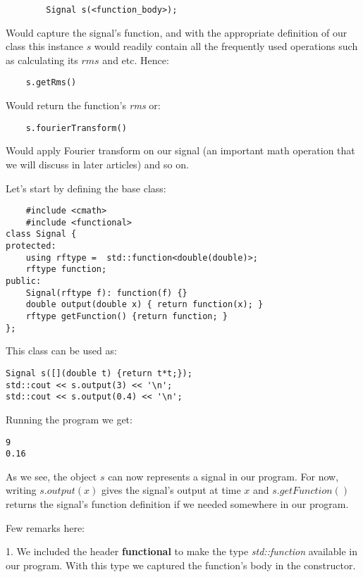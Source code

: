 \documentclass{article}
\begin{document}
	\begin{verbatim}
		Signal s(<function_body>);
	\end{verbatim}
	 
	Would capture the signal's function, and with the appropriate definition of our class this instance $s$ would readily contain all the frequently used operations such as calculating its $rms$ and etc. 
	Hence:
	
	\begin{verbatim}
	s.getRms()
	\end{verbatim}

	Would return the function's \textit{rms} or:
		
	\begin{verbatim}
	s.fourierTransform()
	\end{verbatim}

	Would apply Fourier transform on our signal (an important math operation that we will discuss in later articles) and so on.
		
	Let's start by defining the base class:
	
	\begin{verbatim}
	#include <cmath>
	#include <functional>
class Signal {
protected:
    using rftype =  std::function<double(double)>;
    rftype function;
public:
    Signal(rftype f): function(f) {}
    double output(double x) { return function(x); }
    rftype getFunction() {return function; }
};
	\end{verbatim}
	This class can be used as:
	
	\begin{verbatim}
Signal s([](double t) {return t*t;});
std::cout << s.output(3) << '\n';
std::cout << s.output(0.4) << '\n';
	\end{verbatim}
	Running the program we get:
	
	\begin{verbatim}
9
0.16
	\end{verbatim}
	
	As we see, the object $s$ can now represents a signal in our program.
	For now, writing $s.output(x)$ gives the signal's output at time $x$ and $s.getFunction()$ returns the signal's function definition if we needed somewhere in our program.
		
	Few remarks here:
	
	1. We included the header \textbf{functional} to make the type \textit{std::function} available in our program. With this type we captured the function's body in the constructor.
\end{document}
